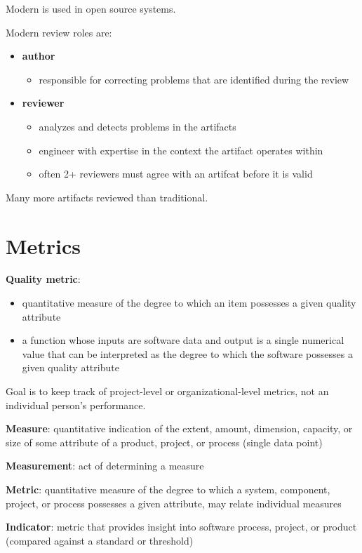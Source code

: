 \documentclass[11pt]{article}
\begin{document}
Modern is used in open source systems.

Modern review roles are:
\begin{itemize}
\item \textbf{author}
\begin{itemize}
\item responsible for correcting problems that are identified during the review
\end{itemize}
\item \textbf{reviewer}
\begin{itemize}
\item analyzes and detects problems in the artifacts
\item engineer with expertise in the context the artifact operates within
\item often 2+ reviewers must agree with an artifcat before it is valid
\end{itemize}
\end{itemize}

Many more artifacts reviewed than traditional.
\section{Metrics}
\label{sec:orgc0b5fd0}
\textbf{Quality metric}:
\begin{itemize}
\item quantitative measure of the degree to which an item possesses a given quality attribute
\item a function whose inputs are software data and output is a single numerical value that can be interpreted
as the degree to which the software possesses a given quality attribute
\end{itemize}

Goal is to keep track of project-level or organizational-level metrics, not an individual person's
performance.

\textbf{Measure}: quantitative indication of the extent, amount, dimension, capacity, or size of some attribute
of a product, project, or process (single data point)

\textbf{Measurement}: act of determining a measure

\textbf{Metric}: quantitative measure of the degree to which a system, component, project, or process
possesses a given attribute, may relate individual measures

\textbf{Indicator}: metric that provides insight into software process, project, or product (compared against
a standard or threshold)
\end{document}
